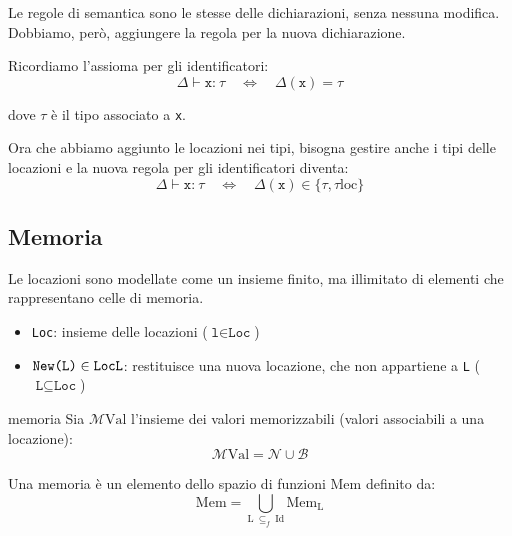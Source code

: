 Le regole di semantica sono le stesse delle dichiarazioni, senza nessuna modifica.\\[0.2ex]
Dobbiamo, però, aggiungere la regola per la nuova dichiarazione.

Ricordiamo l'assioma per gli identificatori:
\[
    \Delta \vdash \texttt{x:} \ \tau \quad \Leftrightarrow \quad \Delta(\texttt{x}) = \tau
\]

dove $\tau$ è il tipo associato a \texttt{x}.

\smallskip
Ora che abbiamo aggiunto le locazioni nei tipi, bisogna gestire anche i tipi delle locazioni e la nuova regola per gli identificatori diventa:
\[
    \Delta \vdash \texttt{x:} \ \tau \quad \Leftrightarrow \quad \Delta(\texttt{x}) \in \{\tau, \tau\mathrm{loc}\}
\]

\subsection{Memoria}
Le locazioni sono modellate come un insieme finito, ma illimitato di elementi che rappresentano celle di memoria.
\begin{itemize}[label=$\triangleright$, itemsep=\smallskipamount]
    \item \texttt{Loc}: insieme delle locazioni ($\texttt{l} \in \texttt{Loc}$)
    \item $\texttt{New(L)} \in \texttt{Loc} \\ \texttt{L}$: restituisce una nuova locazione, che non appartiene a \texttt{L} ($\texttt{L} \subseteq \texttt{Loc}$)
\end{itemize}

\begin{mydef}{memoria}
    Sia $\mathcal{M}\mathrm{Val}$ l'insieme dei valori memorizzabili (valori associabili a una locazione):
    \[
        \mathcal{M}\mathrm{Val} = \mathcal{N} \cup \mathcal{B}
    \]

    \smallskip
    Una memoria è un elemento dello spazio di funzioni $\mathrm{Mem}$ definito da:
    \[
        \mathrm{Mem} = \bigcup\limits_{\mathrm{L} \ \subseteq_f \ \mathrm{Id}} \mathrm{Mem_L}
    \]
\end{mydef}

